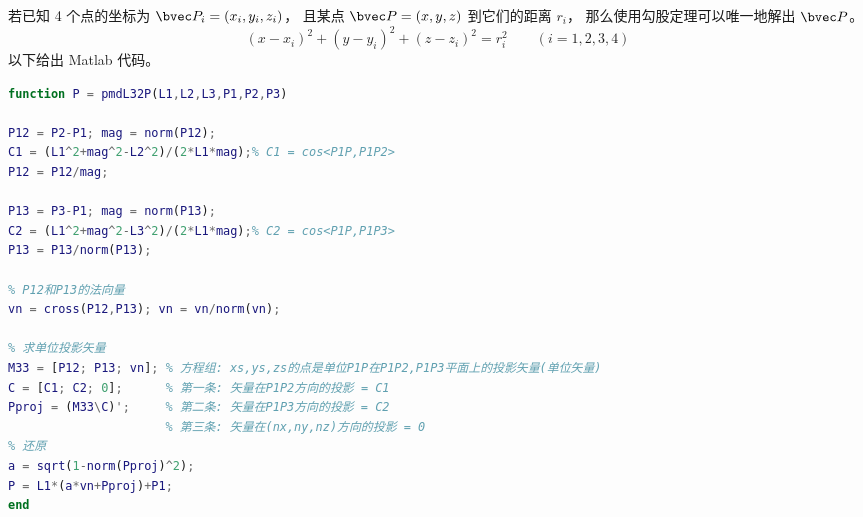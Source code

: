 
\begin{issues}
\issueDraft
\end{issues}

若已知 4 个点的坐标为 $\bvec P_i = (x_i,y_i,z_i)$， 且某点 $\bvec P = (x,y,z)$ 到它们的距离 $r_i$， 那么使用勾股定理可以唯一地解出 $\bvec P$。
\begin{equation}
(x-x_i)^2 + (y-y_i)^2 + (z-z_i)^2 = r_i^2 \qquad (i = 1,2,3,4)
\end{equation}
以下给出 Matlab 代码。

\begin{lstlisting}[language=matlab, caption=pmdL32P.m]
% 已知三棱锥底面的三个点坐标 P1,P2,P3, 和三条棱 L1,L2,L3, 求顶点坐标
function P = pmdL32P(L1,L2,L3,P1,P2,P3)

P12 = P2-P1; mag = norm(P12);
C1 = (L1^2+mag^2-L2^2)/(2*L1*mag);% C1 = cos<P1P,P1P2>
P12 = P12/mag;

P13 = P3-P1; mag = norm(P13);
C2 = (L1^2+mag^2-L3^2)/(2*L1*mag);% C2 = cos<P1P,P1P3>
P13 = P13/norm(P13);

% P12和P13的法向量
vn = cross(P12,P13); vn = vn/norm(vn);

% 求单位投影矢量
M33 = [P12; P13; vn]; % 方程组: xs,ys,zs的点是单位P1P在P1P2,P1P3平面上的投影矢量(单位矢量)
C = [C1; C2; 0];      % 第一条: 矢量在P1P2方向的投影 = C1
Pproj = (M33\C)';     % 第二条: 矢量在P1P3方向的投影 = C2
                      % 第三条: 矢量在(nx,ny,nz)方向的投影 = 0
% 还原
a = sqrt(1-norm(Pproj)^2);
P = L1*(a*vn+Pproj)+P1;
end
\end{lstlisting}

